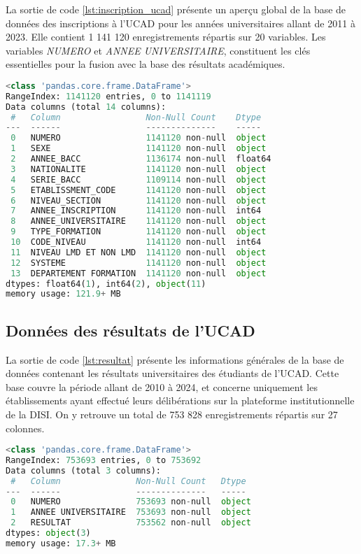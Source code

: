 La sortie de code \ref{lst:inscription_ucad} présente un aperçu global de la base de données des inscriptions à l’UCAD pour les années universitaires allant de 2011 à 2023. 
Elle contient 1 141 120 enregistrements répartis sur 20 variables. Les variables \textit{NUMERO} et \textit{ANNEE UNIVERSITAIRE}, 
constituent les clés essentielles pour la fusion avec la base des résultats académiques.


\begin{lstlisting}[language=Python,
    caption=Info global du data des inscriptions, 
    label=lst:inscription_ucad, 
    basicstyle=\ttfamily\footnotesize, 
    backgroundcolor=\color{gray!10}
]
<class 'pandas.core.frame.DataFrame'>
RangeIndex: 1141120 entries, 0 to 1141119
Data columns (total 14 columns):
 #   Column                 Non-Null Count    Dtype  
---  ------                 --------------    -----  
 0   NUMERO                 1141120 non-null  object 
 1   SEXE                   1141120 non-null  object 
 2   ANNEE_BACC             1136174 non-null  float64
 3   NATIONALITE            1141120 non-null  object 
 4   SERIE_BACC             1109114 non-null  object 
 5   ETABLISSMENT_CODE      1141120 non-null  object 
 6   NIVEAU_SECTION         1141120 non-null  object 
 7   ANNEE_INSCRIPTION      1141120 non-null  int64  
 8   ANNEE_UNIVERSITAIRE    1141120 non-null  object 
 9   TYPE_FORMATION         1141120 non-null  object 
 10  CODE_NIVEAU            1141120 non-null  int64  
 11  NIVEAU LMD ET NON LMD  1141120 non-null  object 
 12  SYSTEME                1141120 non-null  object 
 13  DEPARTEMENT FORMATION  1141120 non-null  object 
dtypes: float64(1), int64(2), object(11)
memory usage: 121.9+ MB
\end{lstlisting}

\newpage
\subsection{Données des résultats de l’UCAD}

La sortie de code \ref{lst:resultat} présente les informations générales de la base de données contenant les résultats universitaires des étudiants de l’UCAD. 
Cette base couvre la période allant de 2010 à 2024, et concerne uniquement les établissements ayant effectué leurs délibérations sur la plateforme institutionnelle de la DISI. 
On y retrouve un total de 753 828 enregistrements répartis sur 27 colonnes.

\begin{lstlisting}[language=Python,
    caption=Info global du data des résultats, 
    label=lst:resultat_ucad, 
    basicstyle=\ttfamily\footnotesize, 
    backgroundcolor=\color{gray!10}
]
<class 'pandas.core.frame.DataFrame'>
RangeIndex: 753693 entries, 0 to 753692
Data columns (total 3 columns):
 #   Column               Non-Null Count   Dtype 
---  ------               --------------   ----- 
 0   NUMERO               753693 non-null  object
 1   ANNEE UNIVERSITAIRE  753693 non-null  object
 2   RESULTAT             753562 non-null  object
dtypes: object(3)
memory usage: 17.3+ MB
\end{lstlisting}

